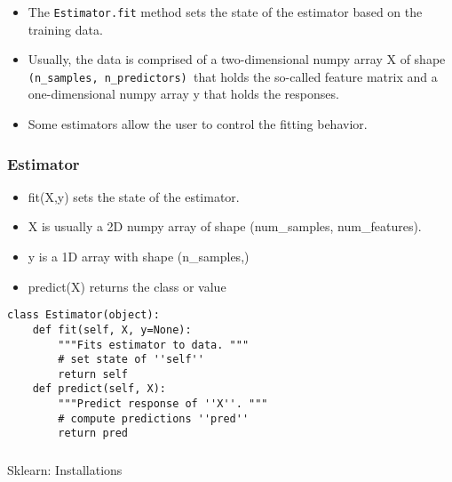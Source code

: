 \begin{frame}[fragile]\frametitle{}
\begin{itemize}
\item The \texttt{Estimator.fit} method sets the state of the estimator based on the training data. 
\item Usually, the data is comprised of a two-dimensional numpy array X of shape \texttt{(n\_samples, n\_predictors) }that holds the so-called feature matrix and a one-dimensional numpy array y that holds the responses. 
\item Some estimators allow the user to control the fitting behavior. 
\end{itemize}
\end{frame}

\begin{frame}[fragile]\frametitle{Estimator}

\begin{itemize}
\item fit(X,y) sets the state of the estimator.
\item  X is usually a 2D numpy array of shape (num\_samples, num\_features).
\item  y is a 1D array with shape (n\_samples,)
\item  predict(X) returns the class or value
\end{itemize}

\begin{lstlisting}
class Estimator(object):
    def fit(self, X, y=None):
        """Fits estimator to data. """
        # set state of ''self''
        return self
    def predict(self, X):
        """Predict response of ''X''. """
        # compute predictions ''pred''
        return pred
\end{lstlisting}
\end{frame}

\begin{frame}[fragile]\frametitle{}
\begin{center}
{\Large Sklearn: Installations}
\end{center}
\end{frame}

%




